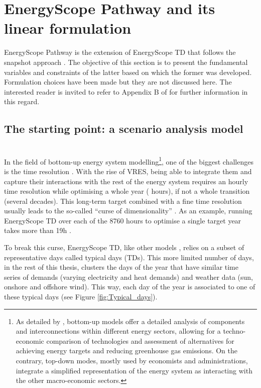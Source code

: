 \section{EnergyScope Pathway and its linear formulation} 
\label{app:ESPathway_full_formulation}

EnergyScope Pathway is the extension of EnergyScope TD \cite{limpens2019energyscope} that follows the snapshot approach \cite{Girones2015}. The objective of this section is to present the fundamental variables and constraints of the latter based on which the former was developed. Formulation choices have been made but they are not discussed here. The interested reader is invited to refer to Appendix B of \cite{limpens2024pathway} for further information in this regard.

\subsection{The starting point: a scenario analysis model}
\label{app:ESTD}

\\

\noindent
In the field of bottom-up energy system modelling\footnote{As detailed by \citet{prina2020classification}, bottom-up models offer a detailed analysis of components and interconnections within different energy sectors, allowing for a techno-economic comparison of technologies and assessment of alternatives for achieving energy targets and reducing greenhouse gas emissions. On the contrary, top-down modes, mostly used by economists and administrations, integrate a simplified representation of the energy system as interacting with the other macro-economic sectors.}, one of the biggest challenges is the time resolution \cite{prina2020classification}. With the rise of \gls{VRES}, being able to integrate them and capture their interactions with the rest of the energy system requires an hourly time resolution while optimising a whole year ( hours), if not a whole transition (\ie several decades). This long-term target combined with a fine time resolution usually leads to the so-called ``curse of dimensionality'' \cite{kuo2005lifting}. As an example, running EnergyScope TD over each of the 8760 hours to optimise a single target year takes more than 19h \cite{limpens2019energyscope}.

To break this curse, EnergyScope TD, like other models \cite{Gabrielli2018,Despres2017,Nahmmacher2014}, relies on a subset of representative days called typical days (TDs). This more limited number of days,  in the rest of this thesis, clusters the days of the year that have similar time series of demands (\ie varying electricity and heat demands) and weather data (\ie sun, onshore and offshore wind). This way, each day of the year is associated to one of these typical days (see Figure \ref{fig:Typical_days}).

